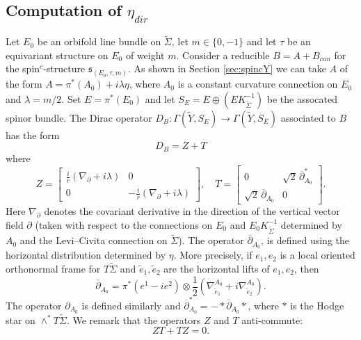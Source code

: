\documentclass{amsart}
\theoremstyle{definition}
\theoremstyle{remark}
\numberwithin{equation}{section}
\begin{document}
\subsection{Computation of $\eta_{dir}$}\label{sec:etadir}

Let $E_0$ be an orbifold line bundle on $\widetilde{\Sigma}$, let $m \in \{0,-1 \}$ and let $\tau$ be an equivariant structure on $E_0$ of weight $m$. Consider a reducible $B = A + B_{can}$ for the spin$^c$-structure $\mathfrak{s}_{(E_0 , \tau , m)}$. As shown in Section \ref{sec:spincY} we can take $A$ of the form $A = \pi^*(A_0) + i \lambda \eta$, where $A_0$ is a constant curvature connection on $E_0$ and $\lambda = m/2$. Set $E = \pi^*(E_0)$ and let $S_E = E \oplus (EK_{\widetilde{\Sigma}}^{-1})$ be the assocated spinor bundle. The Dirac operator $D_B \colon \Gamma( \widetilde{Y} , S_E ) \to \Gamma(\widetilde{Y} , S_E )$ associated to $B$ has the form
\[
D_B = Z + T
\]
where
\[
Z = \left[ \begin{matrix} \frac{i}{r}( \nabla_{\partial} + i\lambda) & 0 \\ 0 & -\frac{i}{r}( \nabla_{\partial} + i\lambda) \end{matrix} \right], \quad T = \left[ \begin{matrix} 0 & \sqrt{2} \, \overline{\partial}_{A_0}^* \\ \sqrt{2} \, \overline{\partial}_{A_0} & 0 \end{matrix} \right].
\]
Here $\nabla_{\partial}$ denotes the covariant derivative in the direction of the vertical vector field $\partial$ (taken with respect to the connections on $E_0$ and $E_0 K_{\widetilde{\Sigma}}^{-1}$ determined by $A_0$ and the Levi--Civita connection on $\widetilde{\Sigma}$). The operator $\overline{\partial}_{A_0}$, is defined using the horizontal distribution determined by $\eta$. More precisely, if $e_1,e_2$ is a local oriented orthonormal frame for $T\widetilde{\Sigma}$ and $\widetilde{e}_1, \widetilde{e}_2$ are the horizontal lifts of $e_1,e_2$, then
\[
\overline{\partial}_{A_0} = \pi^*(e^1 - ie^2) \otimes \frac{1}{2}( \nabla^{A_0}_{\widetilde{e}_1} + i\nabla^{A_0}_{\widetilde{e}_2} ).
\]
The operator $\partial_{A_0}$ is defined similarly and $\overline{\partial}_{A_0}^* = - * \overline{\partial}_{A_0} *$, where $*$ is the Hodge star on $\wedge^* T\widetilde{\Sigma}$. We remark that the operators $Z$ and $T$ anti-commute:
\[
ZT + TZ = 0.
\]
\end{document}
